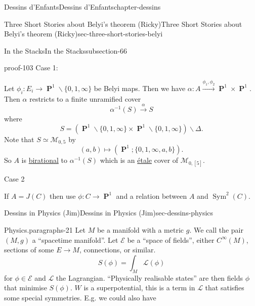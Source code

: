 \documentclass[oneside,10pt,]{book}
\numberwithin{equation}{section}
\newcommand{\cinf}{C^\infty}
\newcommand{\inv}{^{-1}}
\newcommand{\lb}{[}
\newcommand{\rb}{]}
\DeclareMathOperator{\PP}{\mathbf{P}}
\DeclareMathOperator{\Sym}{Sym}
\begin{document}
\begin{chapterptx}{Dessins d'Enfants}{}{Dessins d'Enfants}{}{}{chapter-dessins}
\begin{sectionptx}{Three Short Stories about Belyi's theorem (Ricky)}{}{Three Short Stories about Belyi's theorem (Ricky)}{}{}{sec-three-short-stories-belyi}
\begin{subsectionptx}{In the Stacks}{}{In the Stacks}{}{}{subsection-66}
\begin{proofptx}{}{proof-103}
\hypertarget{p-766}{}%
Case 1:%
\par
\hypertarget{p-767}{}%
Let \(\phi_i \colon E_i \to \PP^1\smallsetminus \{0,1,\infty\}\) be Belyi maps. Then we have \(\alpha \colon A \xrightarrow{\phi_1,\phi_2} \PP^1 \times \PP^1\). Then \(\alpha\) restricts to a finite unramified cover%
\begin{equation*}
\alpha\inv (S) \xrightarrow \alpha S
\end{equation*}
where%
\begin{equation*}
S = (\PP^1 \smallsetminus \{0,1,\infty\} \times \PP^1 \smallsetminus \{0,1,\infty\}) \smallsetminus \Delta\text{.}
\end{equation*}
Note that \(S \simeq \mathcal M_{0,5}\) by%
\begin{equation*}
(a,b ) \mapsto (\PP^1; \{0,1,\infty, a,b\})\text{.}
\end{equation*}
So \(A\) is \hyperref[def-birational]{birational} to \(\alpha\inv (S)\) which is an \hyperref[def-etale]{étale} cover of \(\mathcal M_{0,\lb 5 \rb}\).%
\par
\hypertarget{p-768}{}%
Case 2%
\par
\hypertarget{p-769}{}%
If \(A = J(C)\) then use \(\phi \colon C \to \PP^1\) and a relation between \(A\) and \(\Sym^2(C)\).%
\end{proofptx}
\end{subsectionptx}
\end{sectionptx}
%
%
\typeout{************************************************}
\typeout{************************************************}
%
\begin{sectionptx}{Dessins in Physics (Jim)}{}{Dessins in Physics (Jim)}{}{}{sec-dessins-physics}
\begin{paragraphs}{Physics.}{paragraphs-21}%
\hypertarget{p-770}{}%
Let  \(M\)  be a manifold with  a metric \(g\). We call the pair \((M,g)\) a ``spacetime manifold''. Let \(\mathcal E\) be  a ``space of fields'', either \(\cinf (M)\), sections of some \(E\to M\), connections, or similar.%
\begin{equation*}
S(\phi) = \int_M \mathcal    L (\phi)
\end{equation*}
for \(\phi\in \mathcal E\) and \(\mathcal L\) the Lagrangian. ``Physically realisable states'' are then fields \(\phi\) that minimise \(S(\phi)\). \(W\) is a superpotential, this is a term in \(\mathcal L\) that satisfies some special symmetries. E.g. we could also have%
\begin{equation*}

\end{equation*}
\end{paragraphs}
\end{sectionptx}
\end{chapterptx}
\end{document}
